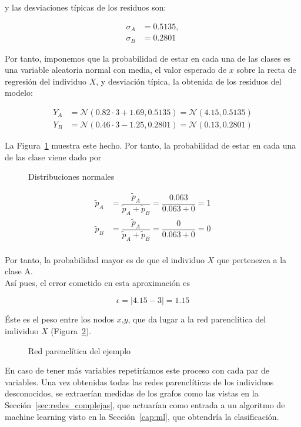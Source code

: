 \begin{ejemplo}
	y las desviaciones típicas de los residuos son:
	
	\begin{align*}
	\sigma_A & = 0.5135,\\
	\sigma_B & = 0.2801
	\end{align*}
	
	Por tanto, imponemos que la probabilidad de estar en cada una de las clases es una variable aleatoria normal con media, el valor esperado de $x$ sobre la recta de regresión del individuo $X$, y desviación típica, la obtenida de los residuos del modelo:
	
	\begin{align*}
	Y_A & = \mathcal{N}(0.82\cdot 3 + 1.69, 0.5135) = \mathcal{N}(4.15, 0.5135)\\
	Y_B & = \mathcal{N}(0.46\cdot 3 - 1.25, 0.2801) = \mathcal{N}(0.13, 0.2801)
	\end{align*}
	
	La Figura~\ref{fig:dist_normales} muestra este hecho. Por tanto, la probabilidad de estar en cada una de las clase viene dado por 
	
	\begin{figure}[htbp!]
		\centering
		\distnormales
		\caption{Distribuciones normales}
		\label{fig:dist_normales}
	\end{figure}
	
	\begin{align*}
	\tilde{p}_A & = \dfrac{\tilde{p}_A}{\tilde{p}_A + \tilde{p}_B} = \dfrac{0.063}{0.063 + 0} = 1 \\
	\tilde{p}_B & = \dfrac{\tilde{p}_A}{\tilde{p}_A + \tilde{p}_B} = \dfrac{0}{0.063 + 0} = 0 \\
	\end{align*}
	
	Por tanto, la probabilidad mayor es de que el individuo $X$ que pertenezca a la clase A.\\
	
	Así pues, el error cometido en esta aproximación es
	
	\begin{equation*}
	\epsilon = |4.15 - 3| = 1.15
	\end{equation*}
	
	Éste es el peso entre los nodos $x$,$y$, que da lugar a la red parenclítica del individuo $X$ (Figura~\ref{fig:red_par}).\\
	
	\begin{figure}[htbp!]
		\centering
		\ejemploredparenclitica
		\caption{Red parenclítica del ejemplo}
		\label{fig:red_par}
	\end{figure}
	
	En caso de tener más variables repetiríamos este proceso con cada par de variables. Una vez obtenidas todas las redes parenclíticas de los individuos desconocidos, se extraerían medidas de los grafos como las vistas en la Sección~\ref{sec:redes_complejas}, que actuarían como entrada a un algoritmo de machine learning visto en la Sección~\ref{cap:ml}, que obtendría la clasificación. 
\end{ejemplo}


